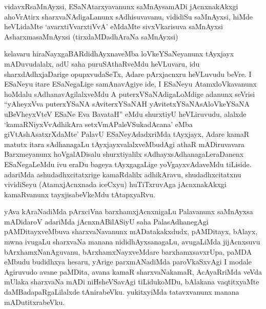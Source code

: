 \begin{artha}
vidavxRsaMnAyxsi, ESaNAtarxyavanunx saMnAysamADi jAcnxnakAkxgi ahoVrAtirx sharxvaNAdigaLanunx sAdhisuvavanu, vididiSu saMnAyxsi, hiMde heVLidaMte `avarxtiVvarxtiVvA' eMdaMte sivxVkarisuva saMnAyxsi AsharxmasaMnAyxsi (tirxdaMDadhAraNa saMnAyxsi)
\end{artha}


\begin{artha}
kelavaru hiraNayxgaBARdidhAyxnaveMba loVkeYSaNeyanunx tAyxjayx mADuvudalalx, adU saha puruSAthaRveMdu heVLuvaru, idu sharxdAdhxjaDarige opupxvudaSeTx, Adare pArxjacnxru heVLuvudu beVre. I ESaNeyu itare ESaNegaLige samAnavAgiye ide, I ESaNeyu AtamxloVkavanunx hoMdalu sAdhanavAgilalxveMdu A puterxVSaNAdigaLoMdige adanunx seVrisi ``yAheyxVva puterxYSaNA sAviterxYSaNAH yAvitetxYSaNAsAloVkeYSaNA uBeVheyxVteV ESaNe Eva BavataH'' eMdu shurxtiyU heVLiruvudu, alalxde `kamaRNiyxVvAdhikAra setxVmAPaleVSukadAcana' eMba giVtAshAsatxrXdaMte' PalavU ESaNeyAdadxriMda tAyxjayx, Adare kamaR matutx itara sAdhanagaLu tAyxjayxvalalxveMbudAgi athaR mADiruvavara Barxmeyanunx hoVgalADisalu shurxtiyalilx sAdhayxsAdhanagaLeraDanenx ESaNegaLeMdu ivu eraDu bageya tAyxgagaLige yoVgayxvAdaveMdu tiLiside. adariMda ashudadhxcitatxrige kamaRdalilx adhikAravu, shudadhxcitatxnu vividiSeyu (AtamxjAcnxnada iceCxyu) huTiTxruvAga jAcnxnakAkxgi kamaRvanunx tayxjisabeVkeMdu tAtapxyaRvu.
\end{artha}


\begin{artha}
yAva kAraNadiMda pArxciVna barxhamxjAcnxnigaLu Palavanunx saMnAyxsa mADidaroV adariMda jAcnxnABilASiyU saha PalasAdhanegAgi pAMDitayxveMbuva sharxvaNavanunx mADatakakxdudx, pAMDitayx, bAlayx, mwna ivugaLu sharxvaNa manana nididhAyxsanagaLu, avugaLiMda jijAcnxsuvu bArxhamxNanAguvanu, bArxhamxNayxveMdare barxhamxsavxrUpa, paMDA eMbudu budidhxya hesaru, yArige parxmANadiMda paroVkaSxvAgi I modale Agiruvudo avane paMDita, avana kamaR sharxvaNakamaR, AcAyaRriMda veVda mUlaka sharxvaNa mADi niHsheVSavAgi tiLidukoMDu, bAlakana vaqtitxyaMte daMBadapaRgaLilalxde tAnirabeVku. yukitxyiMda tatavxvanunx manana mADutitxrabeVku.
\end{artha}



